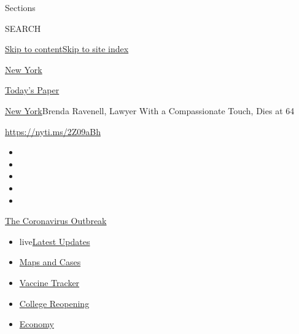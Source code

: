 Sections

SEARCH

\protect\hyperlink{site-content}{Skip to
content}\protect\hyperlink{site-index}{Skip to site index}

\href{https://www.nytimes.com/section/nyregion}{New York}

\href{https://myaccount.nytimes.com/auth/login?response_type=cookie\&client_id=vi}{}

\href{https://www.nytimes.com/section/todayspaper}{Today's Paper}

\href{/section/nyregion}{New York}\textbar{}Brenda Ravenell, Lawyer With
a Compassionate Touch, Dies at 64

\url{https://nyti.ms/2Z09aBh}

\begin{itemize}
\item
\item
\item
\item
\item
\end{itemize}

\href{https://www.nytimes.com/news-event/coronavirus?action=click\&pgtype=Article\&state=default\&region=TOP_BANNER\&context=storylines_menu}{The
Coronavirus Outbreak}

\begin{itemize}
\tightlist
\item
  live\href{https://www.nytimes.com/2020/08/03/world/coronavirus-covid-19.html?action=click\&pgtype=Article\&state=default\&region=TOP_BANNER\&context=storylines_menu}{Latest
  Updates}
\item
  \href{https://www.nytimes.com/interactive/2020/us/coronavirus-us-cases.html?action=click\&pgtype=Article\&state=default\&region=TOP_BANNER\&context=storylines_menu}{Maps
  and Cases}
\item
  \href{https://www.nytimes.com/interactive/2020/science/coronavirus-vaccine-tracker.html?action=click\&pgtype=Article\&state=default\&region=TOP_BANNER\&context=storylines_menu}{Vaccine
  Tracker}
\item
  \href{https://www.nytimes.com/2020/08/02/us/covid-college-reopening.html?action=click\&pgtype=Article\&state=default\&region=TOP_BANNER\&context=storylines_menu}{College
  Reopening}
\item
  \href{https://www.nytimes.com/live/2020/08/03/business/stock-market-today-coronavirus?action=click\&pgtype=Article\&state=default\&region=TOP_BANNER\&context=storylines_menu}{Economy}
\end{itemize}

